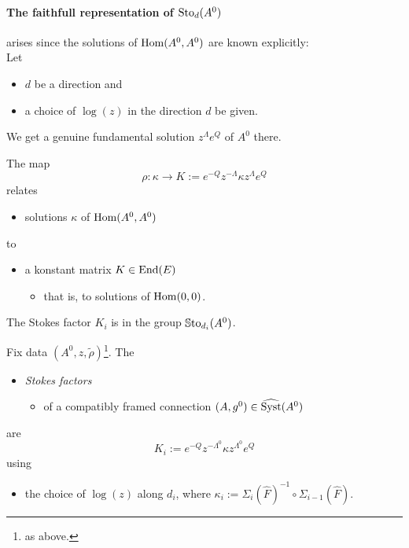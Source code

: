 \paragraph{The faithfull representation of $\operatorname{Sto}_d(A^0)$} arises since the
solutions of $\operatorname{Hom}(A^0,A^0)$ are known explicitly:
\\Let
\begin{itemize}
  \item $d$ be a direction and
  \item a choice of $\log(z)$ in the direction $d$ be given.
\end{itemize}
We get a genuine fundamental solution $z^\Lambda e^Q$ of $A^0$ there.
\begin{paracol}{2} %
  The map
  \[
    \rho:\kappa\to K:=e^{-Q}z^{-\Lambda}\kappa z^\Lambda e^Q
  \]
  relates
  \begin{itemize}
    \item solutions $\kappa$ of $\operatorname{Hom}(A^0,A^0)$
  \end{itemize}
  to
  \begin{itemize}
    \item a konstant matrix $K\in\operatorname{End}(E)$
      \begin{itemize}
        \item that is, to solutions of $\operatorname{Hom}(0,0)$.
      \end{itemize}
  \end{itemize}
  \begin{lem}
    The Stokes factor $K_i$ is in the group $\operatorname{\mathbb{S}to}_{d_i}(A^0)$.
  \end{lem}
  \switchcolumn %
  \begin{defn}
    Fix data $(A^0,z,\tilde\rho)$\footnote{as above.}.
    The
    \begin{itemize}
      \item \emph{Stokes factors}
        \begin{itemize}
          \item of a compatibly framed connection
            $(A,g^0)\in\widehat{\operatorname{Syst}}(A^0)$
        \end{itemize}
    \end{itemize}
    are
    \[
      K_i:=e^{-Q}z^{-\Lambda^0}\kappa z^{\Lambda^0} e^Q
    \]
    using
    \begin{itemize}
      \item the choice of $\log(z)$ along $d_i$, where
        $\kappa_i:=\Sigma_i(\hat F)^{-1}\circ\Sigma_{i-1}(\hat F)$.

\end{itemize}
\end{defn}
\end{paracol}
